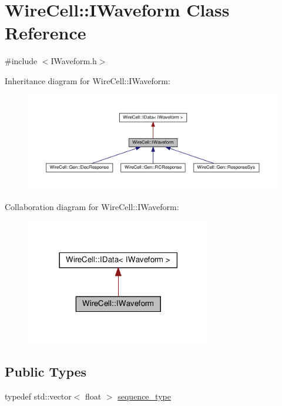\hypertarget{class_wire_cell_1_1_i_waveform}{}\section{Wire\+Cell\+:\+:I\+Waveform Class Reference}
\label{class_wire_cell_1_1_i_waveform}


{\ttfamily \#include $<$I\+Waveform.\+h$>$}



Inheritance diagram for Wire\+Cell\+:\+:I\+Waveform\+:
\nopagebreak
\begin{figure}[H]
\begin{center}
\leavevmode
\includegraphics[width=350pt]{class_wire_cell_1_1_i_waveform__inherit__graph}
\end{center}
\end{figure}


Collaboration diagram for Wire\+Cell\+:\+:I\+Waveform\+:
\nopagebreak
\begin{figure}[H]
\begin{center}
\leavevmode
\includegraphics[width=230pt]{class_wire_cell_1_1_i_waveform__coll__graph}
\end{center}
\end{figure}
\subsection*{Public Types}
\begin{DoxyCompactItemize}
\item 
typedef std\+::vector$<$ float $>$ \hyperlink{class_wire_cell_1_1_i_waveform_ad8f85e800ab8082ddbd89ac91164db7d}{sequence\+\_\+type}
\end{DoxyCompactItemize}
